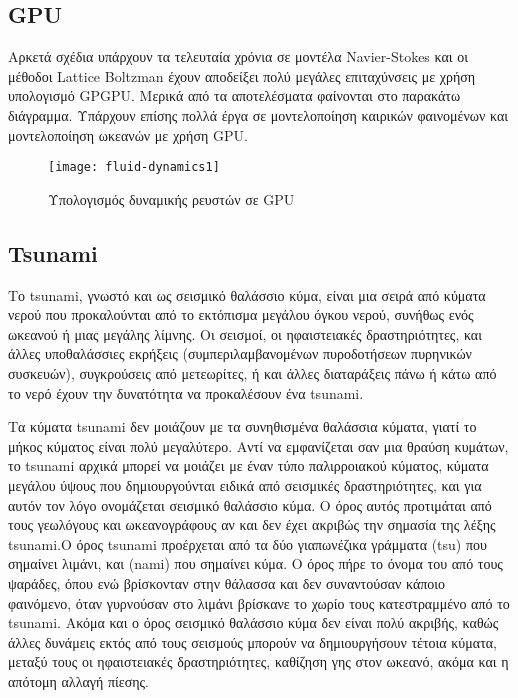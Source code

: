 \subsection{GPU}
Αρκετά σχέδια υπάρχουν τα τελευταία χρόνια σε μοντέλα Navier-Stokes και οι μέθοδοι Lattice Boltzman έχουν αποδείξει πολύ μεγάλες επιταχύνσεις με χρήση υπολογισμό GPGPU. Μερικά από τα αποτελέσματα φαίνονται στο παρακάτω διάγραμμα. Υπάρχουν επίσης πολλά έργα σε μοντελοποίηση καιρικών φαινομένων και μοντελοποίηση ωκεανών με χρήση GPU.

\begin{figure}[h]
\centering
\hspace*{-0.5in}
\texttt{[image: fluid-dynamics1]}
\caption{Υπολογισμός δυναμικής ρευστών σε GPU\cite{figure-13}}
\end{figure}
 
\subsection{Tsunami}
Το tsunami, γνωστό και ως σεισμικό θαλάσσιο κύμα, είναι μια σειρά από κύματα νερού που προκαλούνται από το εκτόπισμα μεγάλου όγκου νερού, συνήθως ενός ωκεανού ή μιας μεγάλης λίμνης. Οι σεισμοί, οι ηφαιστειακές δραστηριότητες, και άλλες υποθαλάσσιες εκρήξεις (συμπεριλαμβανομένων πυροδοτήσεων πυρηνικών συσκευών), συγκρούσεις από μετεωρίτες, ή και άλλες διαταράξεις πάνω ή κάτω από το νερό έχουν την δυνατότητα να προκαλέσουν ένα tsunami.

Τα κύματα tsunami δεν μοιάζουν με τα συνηθισμένα θαλάσσια κύματα, γιατί το μήκος κύματος είναι πολύ μεγαλύτερο. Αντί να εμφανίζεται σαν μια θραύση κυμάτων, το tsunami αρχικά μπορεί να μοιάζει με έναν τύπο παλιρροιακού κύματος,  κύματα μεγάλου ύψους που δημιουργούνται ειδικά από σεισμικές δραστηριότητες, και για αυτόν τον λόγο ονομάζεται σεισμικό θαλάσσιο κύμα. Ο όρος αυτός προτιμάται από τους γεωλόγους και ωκεανογράφους αν και δεν έχει ακριβώς την σημασία της λέξης tsunami.Ο όρος tsunami προέρχεται από τα δύο γιαπωνέζικα γράμματα {\large{}}(tsu) που σημαίνει λιμάνι, και {\large{}}(nami) που σημαίνει κύμα. Ο όρος πήρε το όνομα του από τους ψαράδες, όπου ενώ βρίσκονταν στην θάλασσα και δεν συναντούσαν κάποιο φαινόμενο, όταν γυρνούσαν στο λιμάνι βρίσκανε το χωρίο τους κατεστραμμένο από το tsunami. Ακόμα και ο όρος σεισμικό θαλάσσιο κύμα δεν είναι πολύ ακριβής, καθώς άλλες δυνάμεις εκτός από τους σεισμούς μπορούν να δημιουργήσουν τέτοια κύματα, μεταξύ τους οι ηφαιστειακές δραστηριότητες, καθίζηση γης στον ωκεανό, ακόμα και η απότομη αλλαγή πίεσης. \cite{fluiddynamics-3}
 
